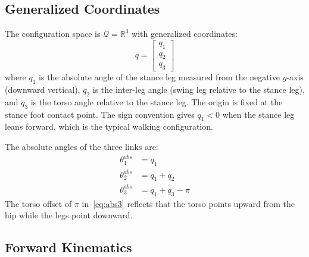 \documentclass[conference]{IEEEtran}
\begin{document}
\subsection{Generalized Coordinates}

The configuration space is $\mathcal{Q} = \mathbb{R}^3$ with generalized coordinates:
\begin{equation}
    q = \begin{bmatrix} q_1 \\ q_2 \\ q_3 \end{bmatrix}
\end{equation}
where $q_1$ is the absolute angle of the stance leg measured from the negative $y$-axis (downward vertical), $q_2$ is the inter-leg angle (swing leg relative to the stance leg), and $q_3$ is the torso angle relative to the stance leg. The origin is fixed at the stance foot contact point. The sign convention gives $q_1 < 0$ when the stance leg leans forward, which is the typical walking configuration.

The absolute angles of the three links are:
\begin{align}
    \theta_1^{abs} &= q_1 \label{eq:abs1}\\
    \theta_2^{abs} &= q_1 + q_2 \label{eq:abs2}\\
    \theta_3^{abs} &= q_1 + q_3 - \pi \label{eq:abs3}
\end{align}
The torso offset of $\pi$ in~\eqref{eq:abs3} reflects that the torso points upward from the hip while the legs point downward.

\subsection{Forward Kinematics}
\end{document}

